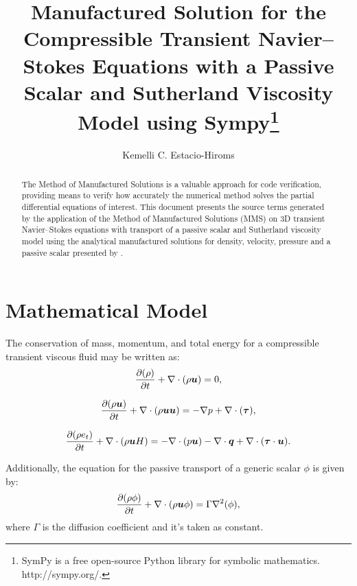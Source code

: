 \documentclass[10pt]{article}
\title{Manufactured Solution for the Compressible Transient Navier--Stokes Equations  with a Passive Scalar and Sutherland Viscosity Model using Sympy\footnote{SymPy is a free open-source Python library for symbolic mathematics.  http://sympy.org/.}}
\author{Kemelli C. Estacio-Hiroms}
\newcommand{\D}{\partial}
\newcommand{\Diff}[2] {\dfrac{\partial( #1)}{\partial #2}}
\newcommand{\bv}[1]{\ensuremath{\mbox{\boldmath$ #1 $}}}
\begin{document}
\maketitle

\begin{abstract}
The Method of Manufactured Solutions is a valuable approach for code verification, providing means to verify how accurately the numerical method solves the partial differential equations of interest.
This document presents the source terms generated by the application of the Method of Manufactured Solutions (MMS) on 3D transient Navier--Stokes equations  with transport of a passive scalar and Sutherland viscosity model using the analytical manufactured solutions for density, velocity, pressure and a passive scalar presented by \citet{Roy2002}.
\end{abstract}





\section{Mathematical Model}
The conservation of mass, momentum, and total energy for a compressible transient viscous fluid may be written as:
\begin{equation}
 \label{eq:ns_01}
\Diff{\rho}{t} +\nabla \cdot \left(\rho \bv{u}\right) = 0,
\end{equation}

\begin{equation}
 \label{eq:ns_02}
\Diff{\rho \bv{u}}{t} +\nabla\cdot\left(\rho\bv{u}\bv{u}\right) = -\nabla p+  \nabla \cdot (\bv{\tau} ),
\end{equation}

\begin{equation}
 \label{eq:ns_03}
\Diff{\rho e_t}{t} +\nabla\cdot\left(\rho \bv{u} H\right) =-   \nabla\cdot(p  \bv{u}) -\nabla\cdot \bv{q} +  \nabla \cdot (\bv{\tau} \cdot \bv{u}).
\end{equation}

Additionally, the equation for the passive transport of a generic scalar $\phi$ is given by:
\begin{equation}
 \label{eq:ns_pscalar}
  \frac{\D (\rho \phi)}{\D t} + \nabla\cdot\left(\rho\bv{u}\phi\right) = \Gamma \nabla^2 (\phi),
\end{equation}
where $\Gamma$ is the diffusion coefficient and it's taken as constant.
\end{document}
